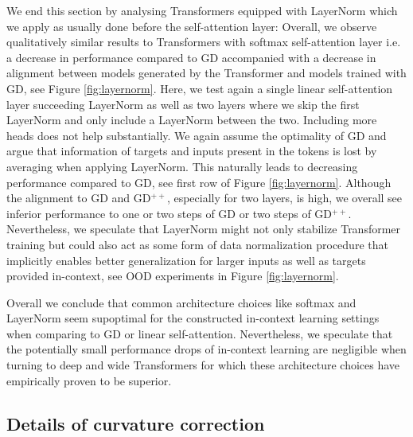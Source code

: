 \documentclass{article}
\theoremstyle{plain}
\theoremstyle{definition}
\theoremstyle{remark}
\begin{document}
We end this section by analysing Transformers equipped with LayerNorm which we apply as usually done before the self-attention layer: Overall, we observe qualitatively similar results to Transformers with softmax self-attention layer i.e. a decrease in performance compared to GD accompanied with a decrease in alignment between models generated by the Transformer and models trained with GD, see Figure \ref{fig:layernorm}.
Here, we test again a single linear self-attention layer succeeding LayerNorm as well as two layers where we skip the first LayerNorm and only include a LayerNorm between the two. Including more heads does not help substantially. 
We again assume the optimality of GD and argue that information of  targets and inputs present in the tokens is lost by averaging when applying LayerNorm. This naturally leads to decreasing performance compared to GD, see first row of Figure \ref{fig:layernorm}. Although the alignment to GD and GD$
^{++}$, especially for two layers, is high, we overall see inferior performance to one or two steps of GD or two steps of GD$^{++}$.
Nevertheless, we speculate that LayerNorm might not only stabilize Transformer training but could also act as some form of data normalization procedure that implicitly enables better generalization for larger inputs as well as targets provided in-context, see OOD experiments in Figure \ref{fig:layernorm}.

Overall we conclude that common architecture choices like softmax and LayerNorm seem supoptimal for the constructed in-context learning settings when comparing to GD or linear self-attention. Nevertheless, we speculate that the potentially small performance drops of in-context learning are negligible when turning to deep and wide Transformers for which these architecture choices have empirically proven to be superior. 

\subsection{Details of curvature correction}
\label{app:curvature_details}
\end{document}
